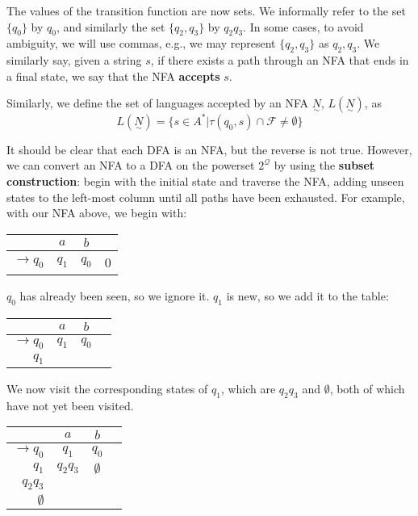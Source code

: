 The values of the transition function are now sets. We informally refer to the set \( \{q_0\} \) by \(q_0\), and similarly the set \( \{q_2, q_3\} \) by \(q_2q_3\). In some cases, to avoid ambiguity, we will use commas, e.g., we may represent \( \{q_2, q_3\} \) as \(q_2,q_3\). We similarly say, given a string \(s\), if there exists a path through an NFA that ends in a final state, we say that the NFA \textbf{accepts} \(s\).

Similarly, we define the set of languages accepted by an NFA \(\underset{\sim}{N}\), \(L(\underset{\sim}{N})\), as \[L(\underset{\sim}{N}) = \{s\in A^*|\tau(q_0, s)\cap\mathcal{F}\neq\emptyset \} \]

It should be clear that each DFA is an NFA, but the reverse is not true. However, we can convert an NFA to a DFA on the powerset \(2^{\mathcal{Q}}\) by using the \textbf{subset construction}: begin with the initial state and traverse the NFA, adding unseen states to the left-most column until all paths have been exhausted. For example, with our NFA above, we begin with:

\begin{center}\begin{tabular}{r c c r}
         & \(a\) & \(b\) & \\\bottomrule
    \(\to q_0\) & \(q_1\) & \(q_0\) & 0 \\
\end{tabular}\end{center}

\(q_0\) has already been seen, so we ignore it. \(q_1\) is new, so we add it to the table:

\begin{center}\begin{tabular}{r c c r}
         & \(a\) & \(b\) & \\\bottomrule
    \(\to q_0\) & \(q_1\) & \(q_0\) &  \\
          \(q_1\) &       &       & 
\end{tabular}\end{center}

We now visit the corresponding states of \(q_1\), which are \(q_2q_3\) and \(\emptyset \), both of which have not yet been visited. 

\begin{center}\begin{tabular}{r c c r}
         & \(a\) & \(b\) & \\\bottomrule
    \(\to q_0\) & \(q_1\) & \(q_0\) &  \\
          \(q_1\) & \(q_2q_3\) & \(\emptyset \) & \\
          \(q_2q_3\) & & & \\
          \(\emptyset \) & & &
\end{tabular}\end{center}

